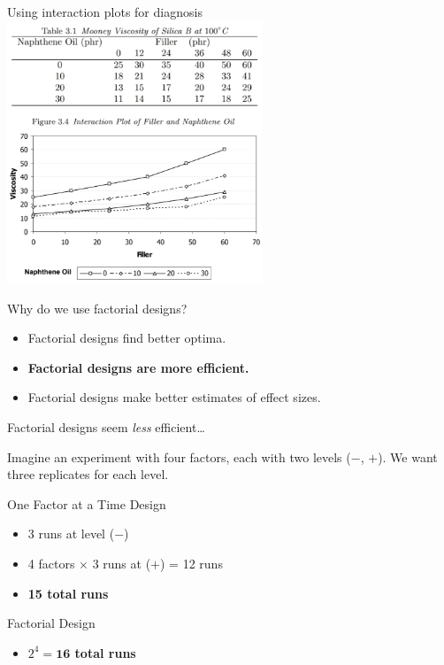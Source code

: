 \documentclass[10pt]{beamer}
\begin{document}
\begin{frame}{Using interaction plots for diagnosis}
\centering
\includegraphics[width=3in]{figures/factorial6.png}

\end{frame}

\begin{frame}{Why do we use factorial designs?}

\begin{itemize}
\item
  Factorial designs find better optima.
\item
  \textbf{Factorial designs are more efficient.}
\item
  Factorial designs make better estimates of effect sizes.
\end{itemize}

\end{frame}

\begin{frame}{Factorial designs seem \emph{less} efficient\ldots{}}

Imagine an experiment with four factors, each with two levels (\(-\),
\(+\)). We want three replicates for each level.

\medskip

One Factor at a Time Design

\begin{itemize}
\item
  3 runs at level (\(-\))
\item
  4 factors \(\times\) 3 runs at (\(+\)) = 12 runs
\item
  \textbf{15 total runs}
\end{itemize}

Factorial Design

\begin{itemize}
\item
  \textbf{$2^4 = \textbf{16}$ total runs}
\end{itemize}

\end{frame}
\end{document}
